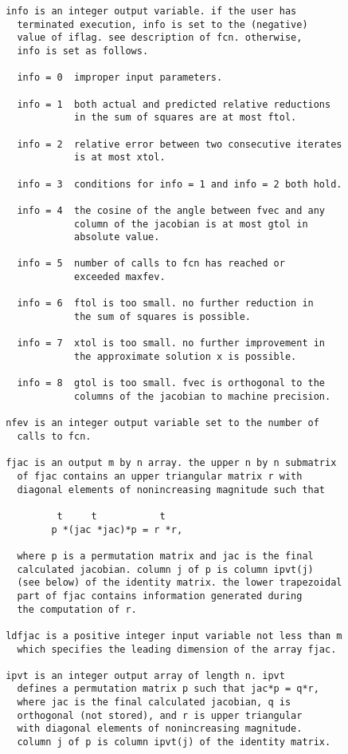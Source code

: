 \begin{verbatim}
       info is an integer output variable. if the user has
         terminated execution, info is set to the (negative)
         value of iflag. see description of fcn. otherwise,
         info is set as follows.

         info = 0  improper input parameters.

         info = 1  both actual and predicted relative reductions
                   in the sum of squares are at most ftol.

         info = 2  relative error between two consecutive iterates
                   is at most xtol.

         info = 3  conditions for info = 1 and info = 2 both hold.

         info = 4  the cosine of the angle between fvec and any
                   column of the jacobian is at most gtol in
                   absolute value.

         info = 5  number of calls to fcn has reached or
                   exceeded maxfev.

         info = 6  ftol is too small. no further reduction in
                   the sum of squares is possible.

         info = 7  xtol is too small. no further improvement in
                   the approximate solution x is possible.

         info = 8  gtol is too small. fvec is orthogonal to the
                   columns of the jacobian to machine precision.

       nfev is an integer output variable set to the number of
         calls to fcn.

       fjac is an output m by n array. the upper n by n submatrix
         of fjac contains an upper triangular matrix r with
         diagonal elements of nonincreasing magnitude such that

                t     t           t
               p *(jac *jac)*p = r *r,

         where p is a permutation matrix and jac is the final
         calculated jacobian. column j of p is column ipvt(j)
         (see below) of the identity matrix. the lower trapezoidal
         part of fjac contains information generated during
         the computation of r.

       ldfjac is a positive integer input variable not less than m
         which specifies the leading dimension of the array fjac.

       ipvt is an integer output array of length n. ipvt
         defines a permutation matrix p such that jac*p = q*r,
         where jac is the final calculated jacobian, q is
         orthogonal (not stored), and r is upper triangular
         with diagonal elements of nonincreasing magnitude.
         column j of p is column ipvt(j) of the identity matrix.


\end{verbatim}
